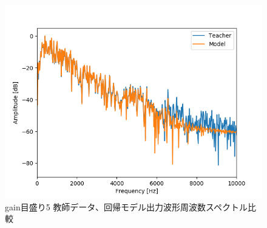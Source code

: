 \documentclass{jreport}		%
\begin{document}
\begin{figure}[htbp]
 \begin{center}
  \includegraphics[width=150mm]{gain5_fft_hikaku.png}
 \end{center}
 \caption{gain目盛り5 教師データ、回帰モデル出力波形周波数スペクトル比較}
 \label{fig:one}
\end{figure}
\end{document}
